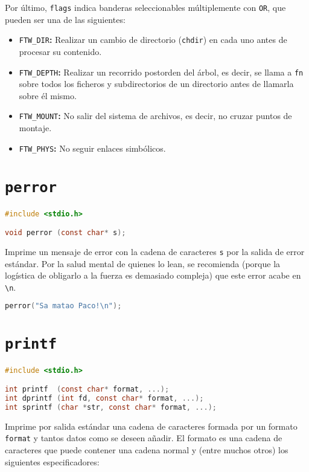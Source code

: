 Por último, \texttt{flags} indica banderas seleccionables múltiplemente con \texttt{OR}, que pueden ser una de las siguientes:

\begin{itemize}
	\item\texttt{FTW\_DIR}\textbf{:} Realizar un cambio de directorio (\texttt{chdir}) en cada uno antes de procesar su contenido.
	\item\texttt{FTW\_DEPTH}\textbf{:} Realizar un recorrido postorden del árbol, es decir, se llama a \texttt{fn} sobre todos los ficheros y subdirectorios de un directorio antes de llamarla sobre él mismo.
	\item\texttt{FTW\_MOUNT}\textbf{:} No salir del sistema de archivos, es decir, no cruzar puntos de montaje.
	\item\texttt{FTW\_PHYS}\textbf{:} No seguir enlaces simbólicos.
\end{itemize}

\section{\texttt{perror}}

\begin{lstlisting}[language=C]
#include <stdio.h>

void perror (const char* s);
\end{lstlisting}

Imprime un mensaje de error con la cadena de caracteres \texttt{s} por la salida de error estándar.
Por la salud mental de quienes lo lean, se recomienda (porque la logística de obligarlo a la fuerza es demasiado compleja) que este error acabe en \texttt{\textbackslash{}n}.

\begin{lstlisting}[language=C]
perror("Sa matao Paco!\n");
\end{lstlisting}

\section{\texttt{printf}}

\begin{lstlisting}[language=C]
#include <stdio.h>

int printf  (const char* format, ...);
int dprintf (int fd, const char* format, ...);
int sprintf (char *str, const char* format, ...);
\end{lstlisting}

Imprime por salida estándar una cadena de caracteres formada por un formato \texttt{format} y tantos datos como se deseen añadir.
El formato es una cadena de caracteres que puede contener una cadena normal y (entre muchos otros) los siguientes especificadores:

